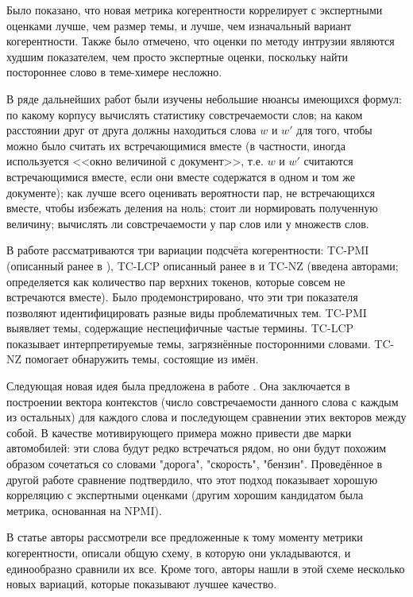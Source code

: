 Было показано, что новая метрика когерентности коррелирует с экспертными оценками лучше, чем размер темы, и лучше, чем изначальный вариант когерентности. Также было отмечено, что оценки по методу интрузии являются худшим показателем, чем просто экспертные оценки, поскольку найти постороннее слово в теме-химере несложно.

В ряде дальнейших работ были изучены небольшие нюансы имеющихся формул: по какому корпусу вычислять статистику совстречаемости слов; на каком расстоянии друг от друга должны находиться слова $w$ и $w'$ для того, чтобы можно было считать их встречающимися вместе (в частности, иногда используется <<окно величиной с документ>>, т.е. $w$ и $w'$ считаются встречающимися вместе, если они вместе содержатся в одном и том же документе); как лучше всего оценивать вероятности пар, не встречающихся вместе, чтобы избежать деления на ноль; стоит ли нормировать полученную величину; вычислять ли совстречаемости у пар слов или у множеств слов.

В работе \cite{boydcare} рассматриваются три вариации подсчёта когерентности: TC-PMI (описанный ранее в \cite{newman2010automatic}), TC-LCP описанный ранее в \cite{mimno} и TC-NZ (введена авторами; определяется как количество пар верхних токенов, которые совсем не встречаются вместе). Было продемонстрировано, что эти три показателя позволяют идентифицировать разные виды проблематичных тем. TC-PMI выявляет темы, содержащие неспецифичные частые термины. TC-LCP показывает интерпретируемые темы, загрязнённые посторонними словами. TC-NZ помогает обнаружить темы, состоящие из имён.

Следующая новая идея была предложена в работе \cite{aletras2013evaluating}. Она заключается в построении вектора контекстов (число совстречаемости данного слова с каждым из остальных) для каждого слова и последующем сравнении этих векторов между собой. В качестве мотивирующего примера можно привести две марки автомобилей: эти слова будут редко встречаться рядом, но они будут похожим образом сочетаться со словами "дорога", "скорость", "бензин". Проведённое в другой работе \cite{mrtl} сравнение подтвердило, что этот подход показывает хорошую корреляцию с экспертными оценками (другим хорошим кандидатом была метрика, основанная на NPMI).

В статье \cite{roder2015exploring} авторы рассмотрели все предложенные к тому моменту метрики когерентности, описали общую схему, в которую они укладываются, и единообразно сравнили их все. Кроме того, авторы нашли в этой схеме несколько новых вариаций, которые показывают лучшее качество.

